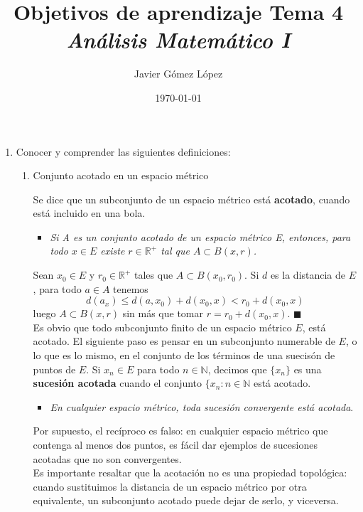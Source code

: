 \documentclass[a4paper, 12pt]{article}
\title{\textbf{Objetivos de aprendizaje Tema 4} \\ \textit{Análisis Matemático I}}
\author{Javier Gómez López}
\date{\today}
\begin{document}
\maketitle

\begin{enumerate}[label=\textbf{\arabic*}.]

\item Conocer y comprender las siguientes definiciones:
	\begin{enumerate}[label=\textit{\alph*})]
	
	\item Conjunto acotado en un espacio métrico
	
	Se dice que un subconjunto de un espacio métrico está \textbf{acotado}, cuando está incluido en una bola.
		\begin{itemize}
		\item \textit{Si A es un conjunto acotado de un espacio métrico E, entonces, para todo \(x \in E\) existe \(r \in \mathbb{R}^+\) tal que \(A \subset B (x,r)\).}
		\end{itemize}
		
	Sean \(x_0 \in E\) y \(r_0 \in \mathbb{R}^+\) tales que \(A \subset B(x_0, r_0)\). Si \(d\) es la distancia de \(E\), para todo \(a \in A\) tenemos
	\[
		d(a_x) \leq d(a, x_0) + d(x_0, x) < r_0 + d(x_0,x)
	\]
	luego \(A \subset B(x,r)\) sin más que tomar \(r = r_0 + d(x_0,x)\). \hfill \(\blacksquare\) \\
	
	Es obvio que todo subconjunto finito de un espacio métrico \(E\), está acotado. El siguiente paso es pensar en un subconjunto numerable de \(E\), o lo que es lo mismo, en el conjunto de los términos de una suecisón de puntos de \(E\). Si \(x_n \in E\) para todo \(n \in \mathbb{N}\), decimos que \(\{x_n\}\) es una \textbf{sucesión acotada} cuando el conjunto \(\{x_n : n \in \mathbb{N}\) está acotado. \\
	
		\begin{itemize}
		\item \textit{En cualquier espacio métrico, toda sucesión convergente está acotada}.
		\end{itemize}
		
	Por supuesto, el recíproco es falso: en cualquier espacio métrico que contenga al menos dos puntos, es fácil dar ejemplos de sucesiones acotadas que no son convergentes. \\
	
	Es importante resaltar que la acotación no es una propiedad topológica: cuando sustituimos la distancia de un espacio métrico por otra equivalente, un subconjunto acotado puede dejar de serlo, y viceversa.
	

\end{enumerate}
\end{enumerate}
\end{document}
